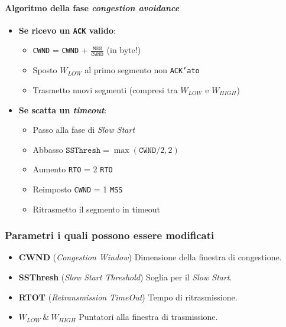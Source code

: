             \paragraph{Algoritmo della fase \textit{congestion avoidance}}
            \begin{itemize}
                \item \textbf{Se ricevo un \texttt{ACK} valido}:\begin{itemize}
                        \item \texttt{CWND} = \texttt{CWND} + $ \frac{\texttt{MSS}}{\texttt{CWND}} $ (in byte!)
                        \item Sposto $W_{LOW}$ al primo segmento non \texttt{ACK'ato}
                        \item Trasmetto nuovi segmenti (compresi tra $W_{LOW}$ e $W_{HIGH}$)
                    \end{itemize}
                \item \textbf{Se scatta un \textit{timeout}}: \begin{itemize}
                        \item Passo alla fase di \textit{Slow Start}
                        \item Abbasso $ \texttt{SSThresh} = \max(\texttt{CWND}/2, 2) $
                        \item Aumento \texttt{RTO} = 2 \texttt{RTO}
                        \item Reimposto \texttt{CWND} = 1 \texttt{MSS}
                        \item Ritrasmetto il segmento in timeout
                \end{itemize}
            \end{itemize}
        \subsubsection{Parametri i quali possono essere modificati}
            \begin{itemize}
                \item \textbf{CWND} (\textit{Congestion Window}) Dimensione della finestra di congestione.
                \item \textbf{SSThresh} (\textit{Slow Start Threshold}) Soglia per il \textit{Slow Start}.
                \item \textbf{RTOT} (\textit{Retransmission TimeOut}) Tempo di ritrasmissione.
                \item \textbf{$W_{LOW}\ \&\ W_{HIGH}$} Puntatori alla finestra di trasmissione.
            \end{itemize}
